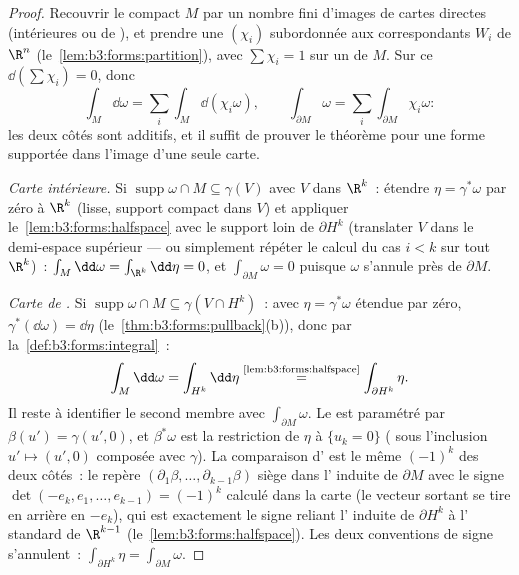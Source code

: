 \begin{proof}
Recouvrir le compact $M$ par un nombre fini d'images de
cartes directes (intérieures ou de ), et prendre une
 $(\chi_i)$ subordonnée aux 
correspondants $W_i$ de $\R^n$ (le~\cref{lem:b3:forms:partition}),
avec $\sum\chi_i = 1$ sur un  de $M$. Sur ce
 $\dd(\sum\chi_i) = 0$, donc
\[
\int_M\dd\omega = \sum_i\int_M\dd(\chi_i\omega),
\qquad
\int_{\partial M}\omega =
\sum_i\int_{\partial M}\chi_i\omega :
\]
les deux côtés sont additifs, et il suffit de prouver le
théorème pour une forme supportée dans l'image d'une seule
carte.

\emph{Carte intérieure.} Si $\operatorname{supp}\omega \cap
M \subseteq \gamma(V)$ avec $V$  dans $\R^k$~: étendre
$\eta = \gamma^*\omega$ par zéro à $\R^k$ (lisse, support
compact dans $V$) et appliquer le~\cref{lem:b3:forms:halfspace}
avec le support loin de $\partial H^k$ (translater $V$ dans
le demi-espace supérieur  --- ou simplement répéter le
calcul du cas $i < k$ sur tout $\R^k$)~: $\int_M\dd\omega =
\int_{\R^k}\dd\eta = 0$, et $\int_{\partial M}\omega = 0$
puisque $\omega$ s'annule près de $\partial M$.

\emph{Carte de .} Si $\operatorname{supp}\omega\cap M
\subseteq \gamma(V \cap H^k)$~: avec $\eta = \gamma^*\omega$
étendue par zéro, $\gamma^*(\dd\omega) = \dd\eta$
(le~\cref{thm:b3:forms:pullback}(b)), donc par
la~\cref{def:b3:forms:integral}~:
\[
\int_M\dd\omega = \int_{H^k}\dd\eta
\overset{\text{\cref{lem:b3:forms:halfspace}}}{=}
\int_{\partial H^k}\eta .
\]
Il reste à identifier le second membre avec $\int_{\partial
M}\omega$. Le  est paramétré par $\beta(u') =
\gamma(u', 0)$, et $\beta^*\omega$ est la restriction de
$\eta$ à $\{u_k = 0\}$ ( sous l'inclusion
$u' \mapsto (u', 0)$ composée avec $\gamma$). La comparaison
d' est le même $(-1)^k$ des deux côtés~: le repère
$(\partial_1\beta, \dots, \partial_{k-1}\beta)$ siège dans
l' induite de $\partial M$ avec le signe
$\det(-e_k, e_1, \dots, e_{k-1}) = (-1)^k$ calculé dans la
carte (le vecteur sortant se tire en arrière en $-e_k$), qui
est exactement le signe reliant l' induite de
$\partial H^k$ à l' standard de $\R^{k-1}$
(le~\cref{lem:b3:forms:halfspace}). Les deux conventions de
signe s'annulent~: $\int_{\partial H^k}\eta =
\int_{\partial M}\omega$.
\end{proof}

